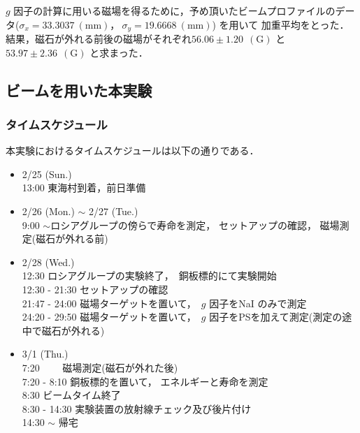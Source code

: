 $g$ 因子の計算に用いる磁場を得るために，予め頂いたビームプロファイルのデータ($\sigma_x=33.3037~(\mathrm{mm})，\ \sigma_y=19.6668~(\mathrm{mm})$) を用いて
加重平均をとった．
結果，磁石が外れる前後の磁場がそれぞれ$56.06\pm 1.20\ ~(\mathrm{G})$ と$53.97\pm 2.36\ ~(\mathrm{G})$ と求まった．
\newpage
\subsection{ビームを用いた本実験}
\subsubsection{タイムスケジュール}
本実験におけるタイムスケジュールは以下の通りである．
\begin{itemize}
\item 2/25 (Sun.)\\
  13:00   東海村到着，前日準備
\item 2/26 (Mon.) $\sim$ 2/27 (Tue.)\\
  9:00 $\sim$ロシアグループの傍らで寿命を測定， セットアップの確認， 磁場測定(磁石が外れる前)
\item 2/28 (Wed.)\\
  12:30   ロシアグループの実験終了，\ 銅板標的にて実験開始\\ 
  12:30 - 21:30 セットアップの確認\\
  21:47 - 24:00 磁場ターゲットを置いて，\ $g$ 因子をNaI のみで測定\\
  24:20 - 29:50 磁場ターゲットを置いて，\ $g$ 因子をPSを加えて測定(測定の途中で磁石が外れる)
\item 3/1 (Thu.)\\
  7:20 　　磁場測定(磁石が外れた後)\\
  7:20 - 8:10 銅板標的を置いて， エネルギーと寿命を測定\\
  8:30   ビームタイム終了\\
  8:30 - 14:30 実験装置の放射線チェック及び後片付け \\
  14:30 $\sim$ 帰宅
\end{itemize}
